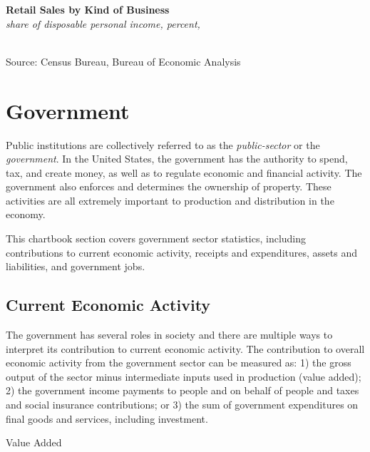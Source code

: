 \documentclass{report}
\newcommand{\tbllink}[1]{\href{https://raw.githubusercontent.com/bdecon/US-chartbook/master/chartbook/data/#1}{\faTable}}
\begin{document}
{\begin{minipage}{0.82\textwidth}
\normalsize \textbf{Retail Sales by Kind of Business}\\
\footnotesize{\textit{share of disposable personal income, percent, }}
\vspace{-1mm}

\hspace*{-2mm} \begin{tikzpicture}

\end{tikzpicture}\\
\footnotesize{Source: Census Bureau, Bureau of Economic Analysis} \hfill \tbllink{rs_ind.csv} \
\end{minipage}
\newpage
{}
\begin{minipage}{0.76\textwidth}
\hypertarget{gov}{\label{gov}} \hypertarget{govce}{\label{govce}}
\section*{Government} \index{government!overview}
\small Public institutions are collectively referred to as the \textit{public-sector} or the \textit{government}. In the United States, the government has the authority to spend, tax, and create money, as well as to regulate economic and financial activity. The government also enforces and determines the ownership of property. These activities are all extremely important to production and distribution in the economy.

This chartbook section covers government sector statistics, including contributions to current economic activity, receipts and expenditures, assets and liabilities, and government jobs.
\subsection*{Current Economic Activity}
\small The government has several roles in society and there are multiple ways to interpret its contribution to current economic activity. The contribution to overall economic activity from the government sector can be measured as: 1) the gross output of the sector minus intermediate inputs used in production (value added); 2) the government income payments to people and on behalf of people and taxes and social insurance contributions; or 3) the sum of government expenditures on final goods and services, including investment. 

\normalsize Value Added
\vspace{-1mm}


\end{minipage}}
\end{document}
